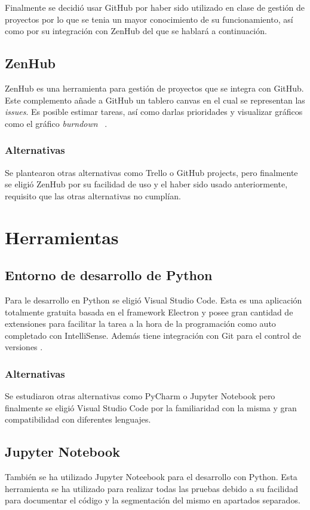 Finalmente se decidió usar GitHub por haber sido utilizado en clase de gestión de proyectos por lo que se tenia un mayor conocimiento de su funcionamiento, así como por su integración con ZenHub del que se hablará a continuación.

\subsection{ZenHub}\label{ZenHub}
ZenHub es una herramienta para gestión de proyectos que se integra con GitHub. Este complemento añade a GitHub un tablero canvas en el cual se representan las \emph{issues}. Es posible estimar tareas, así como darlas prioridades y visualizar gráficos como el gráfico \emph{burndown}~ \cite{zenhub}.

\subsubsection{Alternativas}\label{AlternativasZotero}
Se plantearon otras alternativas como Trello o GitHub projects, pero finalmente se eligió  ZenHub por su facilidad de uso y el haber sido usado anteriormente, requisito que las otras alternativas no cumplían.

\section{Herramientas}

	\subsection{Entorno de desarrollo de Python}\label{Python}
Para le desarrollo en Python se eligió Visual Studio Code. Esta es una aplicación totalmente gratuita basada en el framework Electron y posee gran cantidad de extensiones para facilitar la tarea a la hora de la programación como auto completado con IntelliSense. Además tiene integración con Git para el control de versiones \cite{wiki:vscode_wiki,vscode}.
		\subsubsection{Alternativas}\label{AlternativasIDE}
Se estudiaron otras alternativas como PyCharm o Jupyter Notebook pero finalmente se eligió Visual Studio Code por la familiaridad con la misma y gran compatibilidad con diferentes lenguajes.

	\subsection{Jupyter Notebook}\label{jupyterNotebook}
También se ha utilizado Jupyter Noteebook para el desarrollo con Python. Esta herramienta se ha utilizado para realizar todas las pruebas debido a su facilidad para documentar el código y la segmentación del mismo en apartados separados. 


